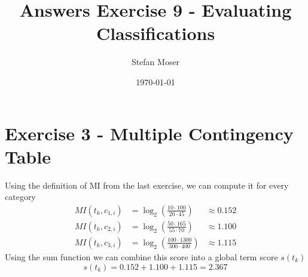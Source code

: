 \documentclass[11pt]{article}
\title{\textbf{Answers Exercise 9 - Evaluating Classifications}}
\author{Stefan Moser}
\date{\today}
\begin{document}
\maketitle

\section*{Exercise 3 - Multiple Contingency Table}
Using the definition of MI from the last exercise, we can compute it for every category
\begin{align}
	MI(t_k, c_{1, i}) &= \log_2 \left( \frac{10 \cdot 100}{20 \cdot 45} \right) &\approx 0.152 \\
	MI(t_k, c_{2, i}) &= \log_2 \left( \frac{50 \cdot 165}{55 \cdot 70} \right) &\approx 1.100 \\
	MI(t_k, c_{3, i}) &= \log_2 \left( \frac{100 \cdot 1300}{300 \cdot 400} \right) &\approx 1.115
\end{align}
Using the sum function we can combine this score into a global term score $s(t_k)$
\begin{equation}
	s(t_k) = 0.152 + 1.100 + 1.115 = 2.367
\end{equation}
\end{document}
